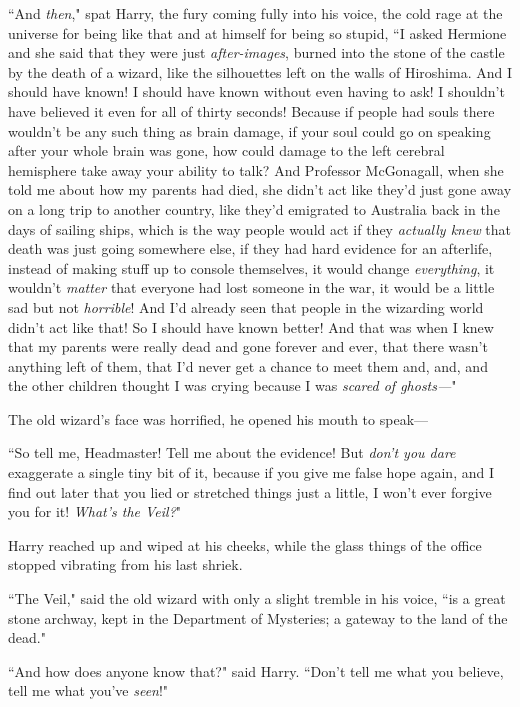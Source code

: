 ``And \emph{then}," spat Harry, the fury coming fully into his voice, the cold rage at the universe for being like that and at himself for being so stupid, ``I asked Hermione and she said that they were just \emph{after-images}, burned into the stone of the castle by the death of a wizard, like the silhouettes left on the walls of Hiroshima. And I should have known! I should have known without even having to ask! I shouldn't have believed it even for all of thirty seconds! Because if people had souls there wouldn't be any such thing as brain damage, if your soul could go on speaking after your whole brain was gone, how could damage to the left cerebral hemisphere take away your ability to talk? And Professor McGonagall, when she told me about how my parents had died, she didn't act like they'd just gone away on a long trip to another country, like they'd emigrated to Australia back in the days of sailing ships, which is the way people would act if they \emph{actually knew} that death was just going somewhere else, if they had hard evidence for an afterlife, instead of making stuff up to console themselves, it would change \emph{everything}, it wouldn't \emph{matter} that everyone had lost someone in the war, it would be a little sad but not \emph{horrible}! And I'd already seen that people in the wizarding world didn't act like that! So I should have known better! And that was when I knew that my parents were really dead and gone forever and ever, that there wasn't anything left of them, that I'd never get a chance to meet them and, and, and the other children thought I was crying because I was \emph{scared of ghosts—}"

The old wizard's face was horrified, he opened his mouth to speak—

``So tell me, Headmaster! Tell me about the evidence! But \emph{don't you dare} exaggerate a single tiny bit of it, because if you give me false hope again, and I find out later that you lied or stretched things just a little, I won't ever forgive you for it! \emph{What's the Veil?}"

Harry reached up and wiped at his cheeks, while the glass things of the office stopped vibrating from his last shriek.

``The Veil," said the old wizard with only a slight tremble in his voice, ``is a great stone archway, kept in the Department of Mysteries; a gateway to the land of the dead."

``And how does anyone know that?" said Harry. ``Don't tell me what you believe, tell me what you've \emph{seen}!"

